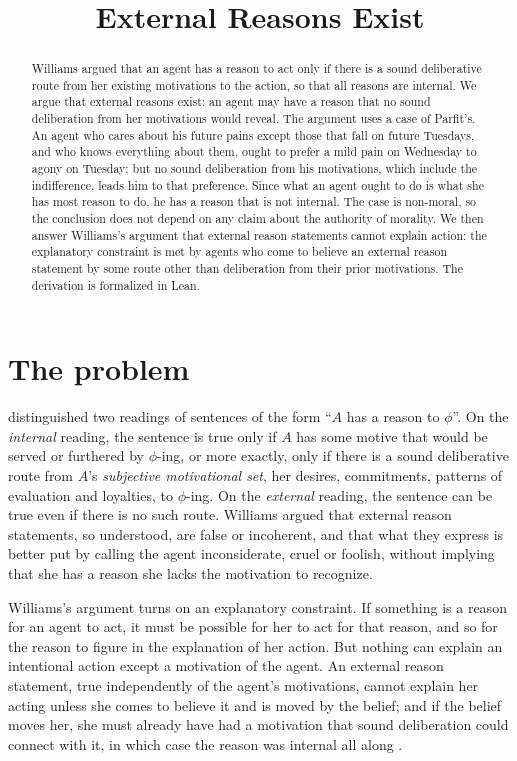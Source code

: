 \documentclass{situationist-preprint}
\title{External Reasons Exist}
\begin{document}
\maketitle

\begin{abstract}
Williams argued that an agent has a reason to act only if there is a sound deliberative route from her existing motivations to the action, so that all reasons are internal. We argue that external reasons exist: an agent may have a reason that no sound deliberation from her motivations would reveal. The argument uses a case of Parfit's. An agent who cares about his future pains except those that fall on future Tuesdays, and who knows everything about them, ought to prefer a mild pain on Wednesday to agony on Tuesday; but no sound deliberation from his motivations, which include the indifference, leads him to that preference. Since what an agent ought to do is what she has most reason to do, he has a reason that is not internal. The case is non-moral, so the conclusion does not depend on any claim about the authority of morality. We then answer Williams's argument that external reason statements cannot explain action: the explanatory constraint is met by agents who come to believe an external reason statement by some route other than deliberation from their prior motivations. The derivation is formalized in Lean.
\end{abstract}

\section{The problem}

\citet{Williams1981} distinguished two readings of sentences of the form \enquote{$A$ has a reason to $\phi$}. On the \emph{internal} reading, the sentence is true only if $A$ has some motive that would be served or furthered by $\phi$-ing, or more exactly, only if there is a sound deliberative route from $A$'s \emph{subjective motivational set}, her desires, commitments, patterns of evaluation and loyalties, to $\phi$-ing. On the \emph{external} reading, the sentence can be true even if there is no such route. Williams argued that external reason statements, so understood, are false or incoherent, and that what they express is better put by calling the agent inconsiderate, cruel or foolish, without implying that she has a reason she lacks the motivation to recognize.

Williams's argument turns on an explanatory constraint. If something is a reason for an agent to act, it must be possible for her to act for that reason, and so for the reason to figure in the explanation of her action. But nothing can explain an intentional action except a motivation of the agent. An external reason statement, true independently of the agent's motivations, cannot explain her acting unless she comes to believe it and is moved by the belief; and if the belief moves her, she must already have had a motivation that sound deliberation could connect with it, in which case the reason was internal all along \citep{Williams1981,Williams1995}.
\end{document}
